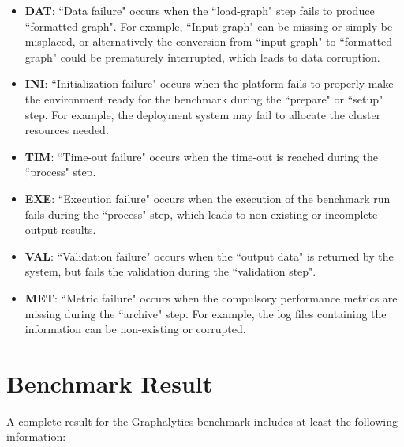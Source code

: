 \begin{itemize}
    \item \textbf{DAT}: ``Data failure" occurs when the ``load-graph" step fails to produce ``formatted-graph". For example, ``Input graph" can be missing or simply be misplaced, or alternatively the conversion from ``input-graph" to ``formatted-graph" could be prematurely interrupted, which leads to data corruption.
    
    \item \textbf{INI}: ``Initialization failure" occurs when the platform fails to properly make the environment ready for the benchmark during the ``prepare" or ``setup" step. For example, the deployment system may fail to allocate the cluster resources needed.
    
    \item \textbf{TIM}: ``Time-out failure" occurs when the time-out is reached during the ``process" step.
    
    \item \textbf{EXE}: ``Execution failure" occurs when the execution of the benchmark run fails during the ``process" step, which leads to non-existing or incomplete output results.
    
    \item \textbf{VAL}: ``Validation failure" occurs when the ``output data" is returned by the system, but fails the validation during the ``validation step".
    
    \item \textbf{MET}: ``Metric failure" occurs when the compulsory performance metrics are missing during the ``archive" step. For example, the log files containing the information can be non-existing or corrupted.
\end{itemize}










\section{Benchmark Result}

 A complete result for the Graphalytics benchmark includes at least the following information: 

